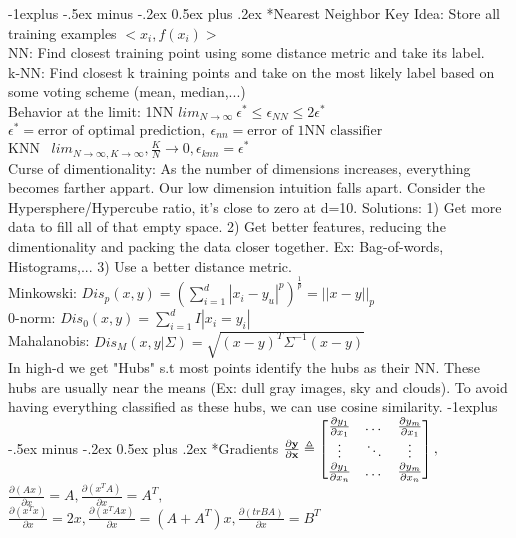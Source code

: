 \documentclass[3pt,landscape]{article}
\makeatletter
\renewcommand{\subsection}{\@startsection{subsection}{2}{0mm}%
                            {-1explus -.5ex minus -.2ex}%
                            {0.5ex plus .2ex}%
                            {\normalfont\normalsize\bfseries}}
\makeatother
\begin{document}
\begin{multicols}{3}

\subsection*{Nearest Neighbor}
Key Idea: Store all training examples $<x_i,f(x_i)>$\\
NN: Find closest training point using some distance metric and take its label.\\
k-NN: Find closest k training points and take on the most likely label based on some voting scheme (mean, median,...)\\
Behavior at the limit: 1NN $lim_{N\to\infty}\ \epsilon^*\le\epsilon_{NN}\le 2\epsilon^*$
$\epsilon^*=\text{error of optimal prediction},\ \epsilon_{nn}=\text{error of 1NN classifier}$\\
KNN \ $lim_{N\to\infty,K\to\infty}, \frac{K}{N}\to 0, \epsilon_{knn}=\epsilon^*$\\
Curse of dimentionality: As the number of dimensions increases, everything becomes farther appart. Our low dimension intuition falls apart. Consider the Hypersphere/Hypercube ratio, it's close to zero at d=10.
Solutions: 1) Get more data to fill all of that empty space. 2) Get better features, reducing the dimentionality and packing the data closer together. Ex: Bag-of-words, Histograms,... 3) Use a better distance metric.\\
Minkowski: $Dis_p(x,y)=(\sum_{i=1}^d|x_i-y_u|^p)^{\frac{1}{p}}=||x-y||_p$\\
0-norm: $Dis_0(x,y)=\sum_{i=1}^d I|x_i=y_i|$\\
Mahalanobis: $Dis_M(x,y|\Sigma)=\sqrt{(x-y)^T\Sigma^{-1}(x-y)}$\\
In high-d we get "Hubs" s.t most points identify the hubs as their NN. These hubs are usually near the means (Ex: dull gray images, sky and clouds). To avoid having everything classified as these hubs, we can use cosine similarity.
\subsection*{Gradients}
\(\frac{\partial \bf{y}}{\partial \bf{x}}\triangleq
    \begin{bmatrix}
    \frac{\partial y_1}{\partial x_1} & \dots & \frac{\partial y_m}{\partial x_1} \\
    \vdots & \ddots & \vdots\\
    \frac{\partial y_1}{\partial x_n} & \dots & \frac{\partial y_m}{\partial x_n}
    \end{bmatrix},
\)
\(\frac{\partial (Ax)}{\partial x}=A, \frac{\partial (x^TA)}{\partial x}=A^T,\)\\
\( \frac{\partial (x^Tx)}{\partial x}=2x, \frac{\partial (x^TAx)}{\partial x}=(A+A^T)x, \frac{\partial (trBA)}{\partial x}=B^T\)


\end{multicols}
\end{document}
